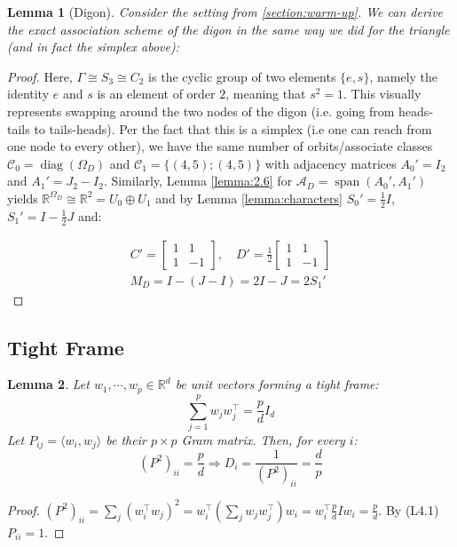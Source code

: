 \documentclass{article}
\theoremstyle{plain}
\newtheorem{lemma}{Lemma}[section]
\numberwithin{equation}{section}
\theoremstyle{definition}
\theoremstyle{remark}
\begin{document}
\begin{lemmaproofbox}
    \begin{lemma}[Digon]\label{corollary:digon}
        Consider the setting from \ref{section:warm-up}. We can derive the exact association scheme of the digon in the same way we did for the triangle (and in fact the simplex above):
    \end{lemma}
    \begin{proof}
        Here, $\Gamma \cong S_3 \cong C_2$ is the cyclic group of two elements $\{e, s\}$, namely the identity $e$ and $s$ is an element of order $2$, meaning that $s^2=1$. This visually represents swapping around the two nodes of the digon (i.e. going from heads-tails to tails-heads). Per the fact that this is a simplex (i.e one can reach from one node to every other), we have the same number of orbits/associate classes $\mathcal{C}_0 =\operatorname{diag}(\Omega_D)$ and $\mathcal{C}_1 = \{(4, 5); (4, 5)\}$ with adjacency matrices $A_0' = I_2$ and  $A_1'=J_2-I_2$. Similarly, Lemma \ref{lemma:2.6} for $\mathcal{A}_D = \operatorname{span}(A_0', A_1')$ yields $\mathbb{R}^{\Omega_D} \cong \mathbb{R}^2 = U_0\oplus U_1$ and by Lemma \ref{lemma:characters} $S_0' = \frac{1}{2}I$, $S_1' = I-\frac{1}{2}J$ and:

\vspace{-14pt}

\begin{align*}
C' = \begin{bmatrix}1 & 1 \\ 1 & -1\end{bmatrix}, \quad D' =\frac{1}{2} \begin{bmatrix}1 & 1 \\ 1 & -1\end{bmatrix}    \\
M_D = I-(J-I) = 2I-J = 2S_1'
\end{align*}

    \end{proof}
\end{lemmaproofbox}

\subsection{Tight Frame}
\label{appendix:tight_frame}
\begin{lemmaproofbox}
\begin{lemma} Let $w_1, \cdots, w_p\in \mathbb{R}^d$ be unit vectors forming a tight frame: $$\sum_{j=1}^p w_j w_j^\top  = \frac{p}{d}I_d$$
Let $P_{ij} = \langle w_i, w_j\rangle$ be their $p\times p$ Gram matrix. Then, for every $i$:$$(P^2)_{ii} = \frac{p}{d}\Rightarrow D_i = \frac{1}{(P^2)_{ii}} = \frac{d}{p}$$
\end{lemma}
\begin{proof} $(P^2)_{ii} = \sum_j (w_i^\top w_j)^2 = w_i^\top \left(\sum_j w_j w_j^\top\right) w_i = w_i^\top \frac{p}{d}Iw_i = \frac{p}{d}$. By (L4.1)  $P_{ii}=1$.\end{proof}
\end{lemmaproofbox}
\end{document}
